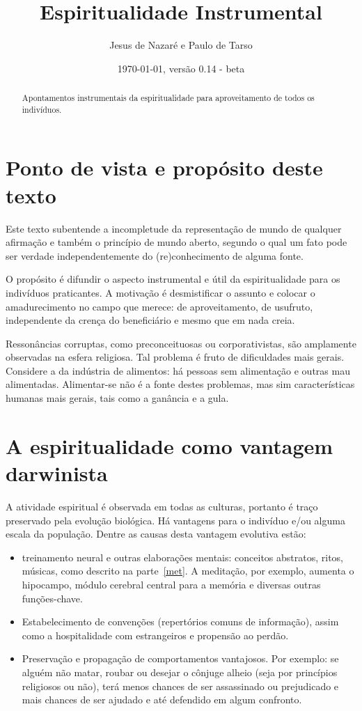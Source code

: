 \documentclass[a4paper]{article}
\title{Espiritualidade Instrumental}
\author{Jesus de Nazaré e Paulo de Tarso}
\date{\today, versão 0.14 - beta}
\begin{document}
\maketitle



\begin{abstract}
Apontamentos instrumentais da espiritualidade para aproveitamento de todos os indivíduos.
\end{abstract}

\tableofcontents

\section{Ponto de vista e propósito deste texto}
Este texto subentende a incompletude da representação de mundo de qualquer afirmação e também o princípio de mundo aberto, segundo o qual um fato pode ser verdade independentemente do (re)conhecimento de alguma fonte.

O propósito é difundir o aspecto instrumental e útil da espiritualidade para os indivíduos praticantes. A motivação é desmistificar o assunto e colocar o amadurecimento no campo que merece: de aproveitamento, de usufruto, independente da crença do beneficiário e mesmo que em nada creia.

Ressonâncias corruptas, como preconceituosas ou corporativistas, são amplamente observadas na esfera religiosa. Tal problema é fruto de
dificuldades mais gerais.
Considere a da indústria de alimentos: há pessoas sem alimentação e outras mau alimentadas.
Alimentar-se não é a fonte destes problemas,
mas sim características humanas mais gerais,
tais como a ganância e a gula.

\section{A espiritualidade como vantagem darwinista}
A atividade espiritual é observada em todas as culturas, portanto é traço preservado pela evolução biológica.
Há vantagens para o indivíduo e/ou alguma escala da população. Dentre as causas desta vantagem evolutiva estão:
\begin{itemize}
  \item treinamento neural e outras elaborações mentais: conceitos abstratos, ritos, músicas, como descrito na parte~\ref{met}. A meditação, por exemplo, aumenta o hipocampo, módulo cerebral central para a memória e diversas outras funções-chave.
    \item Estabelecimento de convenções (repertórios comuns de informação), assim como a hospitalidade com estrangeiros e propensão ao perdão.
    \item Preservação e propagação de comportamentos vantajosos. Por exemplo: se alguém não matar, roubar ou desejar o cônjuge alheio (seja por princípios religiosos ou não), terá menos chances de ser assassinado ou prejudicado e mais chances de ser ajudado e até defendido em algum confronto.
\end{itemize}
\end{document}
